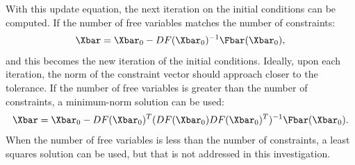 With this update equation, the next iteration on the initial conditions can be computed. If the
number of free variables matches the number of constraints:
\begin{equation}
    \Xbar=\Xbar_{0}-DF(\Xbar_{0})^{-1}\Fbar(\Xbar_{0}),
    \label{eq:NRsolution}
\end{equation}
and this becomes the new iteration of the initial conditions. Ideally, upon each iteration, the
norm of the constraint vector should approach closer to the tolerance. If the number of free
variables is greater than the number of constraints, a minimum-norm solution can be used:
\begin{equation}
    \Xbar=\Xbar_{0}-DF(\Xbar_{0})^{T}(DF(\Xbar_{0})DF(\Xbar_{0})^{T})^{-1}\Fbar(\Xbar_{0}).
    \label{eq:minimumnorm}
\end{equation}
When the number of free variables is less than the number of constraints, a least squares solution
can be used, but that is not addressed in this investigation.

